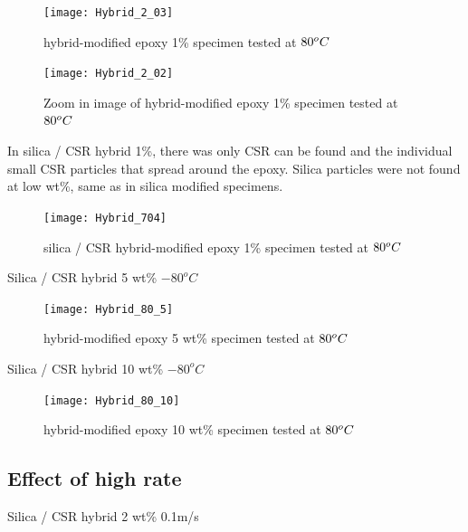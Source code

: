 \documentclass[numbers=noendperiod,chapterprefix=on]{icldt} %
\begin{document}
{\begin{figure}[!htpb]
\centering
\texttt{[image: Hybrid\_2\_03]}
\caption{hybrid-modified epoxy 1\% specimen tested at  $\-80 ^oC$}\label{Hybrid_2_03}
\end{figure}
\FloatBarrier

\begin{figure}[!htpb]
\centering
\texttt{[image: Hybrid\_2\_02]}
\caption{Zoom in image of hybrid-modified epoxy 1\% specimen tested at  $\-80 ^oC$}\label{Hybrid_2_02}
\end{figure}
\FloatBarrier

In silica / CSR hybrid 1\%, there was only CSR can be found and the individual small CSR particles that spread around the epoxy. Silica particles were not found at low wt\%, same as in silica modified specimens.

\begin{figure}[!htpb]
\centering
\texttt{[image: Hybrid\_704]}
\caption{silica / CSR hybrid-modified epoxy 1\% specimen tested at  $\-80 ^oC$}\label{Hybrid_704}
\end{figure}
\FloatBarrier

Silica / CSR hybrid 5 wt\% $-80 ^oC$

\begin{figure}[!htpb]
\centering
\texttt{[image: Hybrid\_80\_5]}
\caption{hybrid-modified epoxy 5 wt\% specimen tested at  $\-80 ^oC$}\label{Hybrid_80_5}
\end{figure}
\FloatBarrier

Silica / CSR hybrid 10 wt\% $-80 ^oC$

\begin{figure}[!htpb]
\centering
\texttt{[image: Hybrid\_80\_10]}
\caption{hybrid-modified epoxy 10 wt\% specimen tested at  $\-80 ^oC$}\label{Hybrid_80_10}
\end{figure}
\FloatBarrier

\subsection{Effect of high rate}

Silica / CSR hybrid 2 wt\% 0.1m/s

}
\end{document}
